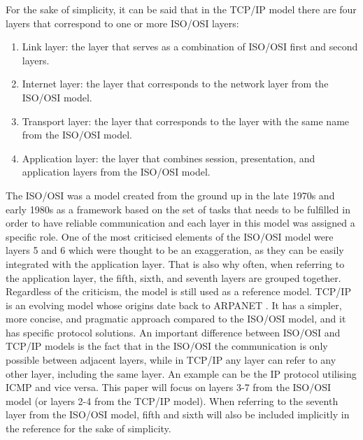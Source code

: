 For the sake of simplicity, it can be said that in the TCP/IP model there are four layers that correspond to one or more ISO/OSI layers:
\begin{enumerate}
    \item Link layer: the layer that serves as a combination of ISO/OSI first and second layers.
    \item Internet layer: the layer that corresponds to the network layer from the ISO/OSI model.
    \item Transport layer: the layer that corresponds to the layer with the same name from the ISO/OSI model.
    \item Application layer: the layer that combines session, presentation, and application layers from the ISO/OSI model.
\end{enumerate}
The ISO/OSI was a model created from the ground up in the late 1970s and early 1980s as a framework based on the set of tasks that needs to be fulfilled in order to have reliable communication and each layer in this model was assigned a specific role. One of the most criticised elements of the ISO/OSI model were layers 5 and 6 which were thought to be an exaggeration, as they can be easily integrated with the application layer. That is also why often, when referring to the application layer, the fifth, sixth, and seventh layers are grouped together. Regardless of the criticism, the model is still used as a reference model.
TCP/IP is an evolving model whose origins date back to ARPANET \cite{rfc1}. It has a simpler, more concise, and pragmatic approach compared to the ISO/OSI model, and it has specific protocol solutions. An important difference between ISO/OSI and TCP/IP models is the fact that in the ISO/OSI the communication is only possible between adjacent layers, while in TCP/IP any layer can refer to any other layer, including the same layer. An example can be the IP protocol utilising ICMP and vice versa.
This paper will focus on layers 3-7 from the ISO/OSI model (or layers 2-4 from the TCP/IP model). When referring to the seventh layer from the ISO/OSI model, fifth and sixth will also be included implicitly in the reference for the sake of simplicity.


